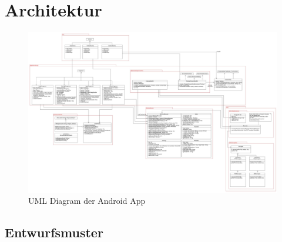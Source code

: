 \section{Architektur}

\begin{figure}[ht]
	\centering
\includegraphics[width=1\textwidth]{./resources/Diagramme/App/UMLAndroidApp.jpg}
\caption{UML Diagram der Android App}
	\label{fig:modules_overview}
\end{figure}

\subsection{Entwurfsmuster}